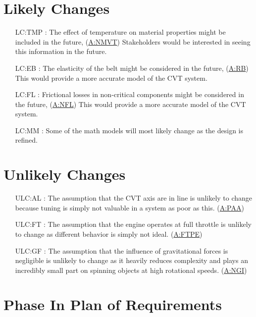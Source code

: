 \documentclass[12pt]{article}
\newcommand{\hpref}[1]{\hyperref[#1]{#1}}
\begin{document}
\section{Likely Changes}    

\noindent \begin{itemize}

\item[LC:TMP \label{LC:TMP}:] The effect of temperature on material properties might be included in the future, (\hpref{A:NMVT}) Stakeholders would be interested in seeing this information in the future.
\item[LC:EB \label{LC:EB}:] The elasticity of the belt might be considered in the future, (\hpref{A:RB}) This would provide a more accurate model of the CVT system.
\item[LC:FL \label{LC:FL}:] Frictional losses in non-critical components might be considered in the future, (\hpref{A:NFL}) This would provide a more accurate model of the CVT system.
\item[LC:MM \label{LC:MM}:] Some of the math models will most likely change as the design is refined.

\end{itemize}

\section{Unlikely Changes}    

\begin{itemize}

  \item[ULC:AL \label{ULC:AL}:] The assumption that the CVT axis are in line is unlikely to change because tuning is simply not valuable in a system as poor as this. (\hpref{A:PAA})
  \item[ULC:FT \label{ULC:FT}:] The assumption that the engine operates at full throttle is unlikely to change as different behavior is simply not ideal. (\hpref{A:FTPE})
  \item[ULC:GF \label{ULC:GF}:] The assumption that the influence of gravitational forces is negligible is unlikely to change as it heavily reduces complexity and plays an incredibly small part on spinning objects at high rotational speeds. (\hpref{A:NGI})
  
  \end{itemize}

  \section{Phase In Plan of Requirements}
\end{document}
